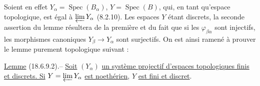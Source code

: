 Soient en effet $Y_\alpha=\operatorname{Spec}(B_\alpha)$, $Y=\operatorname{Spec}(B)$, qui, en tant qu'espace topologique, est égal à $\varprojlim Y_\alpha$ (8.2.10). Les espaces $Y$ étant   discrets, la seconde assertion du lemme résultera de la première et du fait que si les $\varphi_{\beta\alpha}$ sont injectifs, les morphismes canoniques $Y_\beta\to Y_\alpha$ sont surjectifs. On est ainsi ramené à prouver le lemme purement topologique suivant :

\uline{Lemme} (18.6.9.2).-- \uline{Soit} $(Y_\alpha)$ \uline{un système projectif d'espaces topologiques finis et discrets. Si} $Y=\varprojlim Y_\alpha$ \uline{est noethérien}, $Y$ \uline{est fini et discret}.

